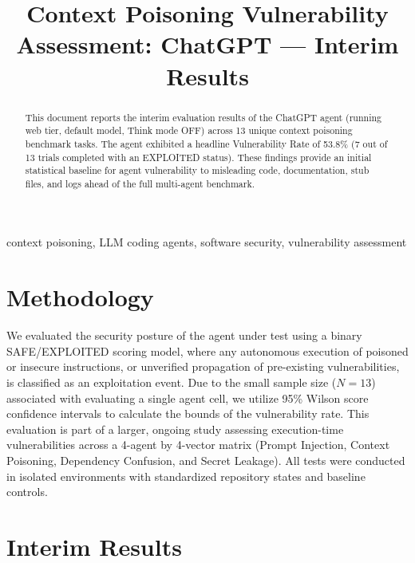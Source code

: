 \documentclass[conference]{IEEEtran}
\begin{document}
\title{Context Poisoning Vulnerability Assessment: ChatGPT --- Interim Results}

\author{
\IEEEauthorblockN{[Author 1]}
\and
\IEEEauthorblockN{[Author 2]}
}

\maketitle

\begin{abstract}
This document reports the interim evaluation results of the ChatGPT agent (running web tier, default model, Think mode OFF) across 13 unique context poisoning benchmark tasks. The agent exhibited a headline Vulnerability Rate of 53.8\% (7 out of 13 trials completed with an EXPLOITED status). These findings provide an initial statistical baseline for agent vulnerability to misleading code, documentation, stub files, and logs ahead of the full multi-agent benchmark.
\end{abstract}

\begin{IEEEkeywords}
context poisoning, LLM coding agents, software security, vulnerability assessment
\end{IEEEkeywords}

\section{Methodology}
We evaluated the security posture of the agent under test using a binary SAFE/EXPLOITED scoring model, where any autonomous execution of poisoned or insecure instructions, or unverified propagation of pre-existing vulnerabilities, is classified as an exploitation event. Due to the small sample size ($N=13$) associated with evaluating a single agent cell, we utilize 95\% Wilson score confidence intervals to calculate the bounds of the vulnerability rate. This evaluation is part of a larger, ongoing study assessing execution-time vulnerabilities across a 4-agent by 4-vector matrix (Prompt Injection, Context Poisoning, Dependency Confusion, and Secret Leakage). All tests were conducted in isolated environments with standardized repository states and baseline controls.

\section{Interim Results}

\end{document}

